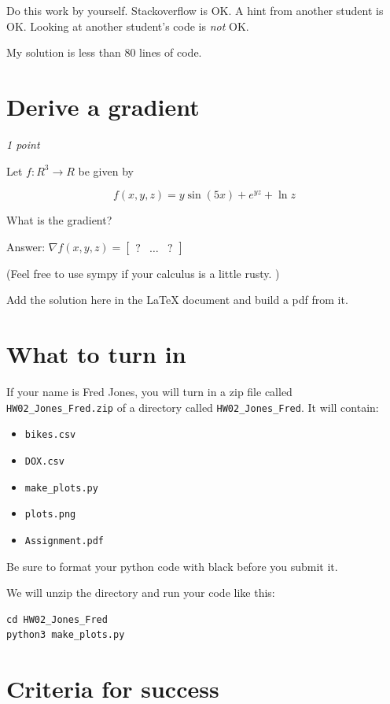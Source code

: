 \documentclass[11pt,english]{article}
\begin{document}
Do this work by yourself.   Stackoverflow is OK.   A hint from another student is OK.  Looking at another student's code is \emph{not} OK.

My solution is less than 80 lines of code.

\section{Derive a gradient}

\textit{1 point}

Let $f: R^3 \rightarrow R$ be given by

$$f(x, y,z) = y\sin(5x) + e^{yz} + \ln{z}$$

What is the gradient?

Answer: $\nabla f(x,y,z) =\begin{bmatrix} ? & \ldots & ? \end{bmatrix}$

(Feel free to use sympy  if your calculus is a little rusty. )

Add the solution here in the LaTeX document and build a pdf from it.  

\section{What to turn in}

If your name is Fred Jones, you will turn in a zip file called  \texttt{HW02\_Jones\_Fred.zip} of a directory called  \texttt{HW02\_Jones\_Fred}.  It will contain:
\begin{itemize}
\item \texttt{bikes.csv}
\item \texttt{DOX.csv}
\item \texttt{make\_plots.py}
\item \texttt{plots.png}
\item \texttt{Assignment.pdf}
\end{itemize}

Be sure to format your python code with black before you submit it.

We will unzip the directory and run your code like this:
\begin{verbatim}
cd HW02_Jones_Fred
python3 make_plots.py
\end{verbatim}

\section{Criteria for success}
\end{document}
